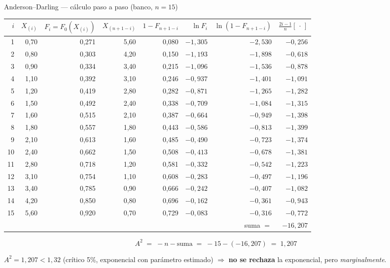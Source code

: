 \documentclass[aspectratio=1610, 10pt]{beamer}
\begin{document}
\begin{frame}{Anderson--Darling — cálculo paso a paso (banco, $n=15$)}
  \begin{center}\scriptsize
    \renewcommand{\arraystretch}{1.05}
    \begin{tabular}{rrrrrrrr}
      \toprule
      $i$ & $X_{(i)}$ & $F_i{=}F_0(X_{(i)})$ & $X_{(n{+}1{-}i)}$ & $1{-}F_{n+1-i}$ & $\ln F_i$ & $\ln(1{-}F_{n+1-i})$ & $\tfrac{2i-1}{n}[\,\cdot\,]$ \\
      \midrule
      1 & 0{,}70 & 0{,}271 & 5{,}60 & 0{,}080 & $-1{,}305$ & $-2{,}530$ & $-0{,}256$ \\
      2 & 0{,}80 & 0{,}303 & 4{,}20 & 0{,}150 & $-1{,}193$ & $-1{,}898$ & $-0{,}618$ \\
      3 & 0{,}90 & 0{,}334 & 3{,}40 & 0{,}215 & $-1{,}096$ & $-1{,}536$ & $-0{,}878$ \\
      4 & 1{,}10 & 0{,}392 & 3{,}10 & 0{,}246 & $-0{,}937$ & $-1{,}401$ & $-1{,}091$ \\
      5 & 1{,}20 & 0{,}419 & 2{,}80 & 0{,}282 & $-0{,}871$ & $-1{,}265$ & $-1{,}282$ \\
      6 & 1{,}50 & 0{,}492 & 2{,}40 & 0{,}338 & $-0{,}709$ & $-1{,}084$ & $-1{,}315$ \\
      7 & 1{,}60 & 0{,}515 & 2{,}10 & 0{,}387 & $-0{,}664$ & $-0{,}949$ & $-1{,}398$ \\
      8 & 1{,}80 & 0{,}557 & 1{,}80 & 0{,}443 & $-0{,}586$ & $-0{,}813$ & $-1{,}399$ \\
      9 & 2{,}10 & 0{,}613 & 1{,}60 & 0{,}485 & $-0{,}490$ & $-0{,}723$ & $-1{,}374$ \\
     10 & 2{,}40 & 0{,}662 & 1{,}50 & 0{,}508 & $-0{,}413$ & $-0{,}678$ & $-1{,}381$ \\
     11 & 2{,}80 & 0{,}718 & 1{,}20 & 0{,}581 & $-0{,}332$ & $-0{,}542$ & $-1{,}223$ \\
     12 & 3{,}10 & 0{,}754 & 1{,}10 & 0{,}608 & $-0{,}283$ & $-0{,}497$ & $-1{,}196$ \\
     13 & 3{,}40 & 0{,}785 & 0{,}90 & 0{,}666 & $-0{,}242$ & $-0{,}407$ & $-1{,}082$ \\
     14 & 4{,}20 & 0{,}850 & 0{,}80 & 0{,}696 & $-0{,}162$ & $-0{,}361$ & $-0{,}943$ \\
     15 & 5{,}60 & 0{,}920 & 0{,}70 & 0{,}729 & $-0{,}083$ & $-0{,}316$ & $-0{,}772$ \\
      \midrule
      \multicolumn{7}{r}{suma $=$} & $-16{,}207$ \\
      \bottomrule
    \end{tabular}
  \end{center}

  \[
    A^2 \;=\; -n - \text{suma} \;=\; -15 - (-16{,}207) \;=\; 1{,}207
  \]

  \begin{resultadobox}
    $A^2 = 1{,}207 < 1{,}32$ (crítico 5\%, exponencial con parámetro estimado)
    $\Rightarrow$ \textbf{no se rechaza} la exponencial, pero \emph{marginalmente}.
  \end{resultadobox}
\end{frame}
\end{document}
